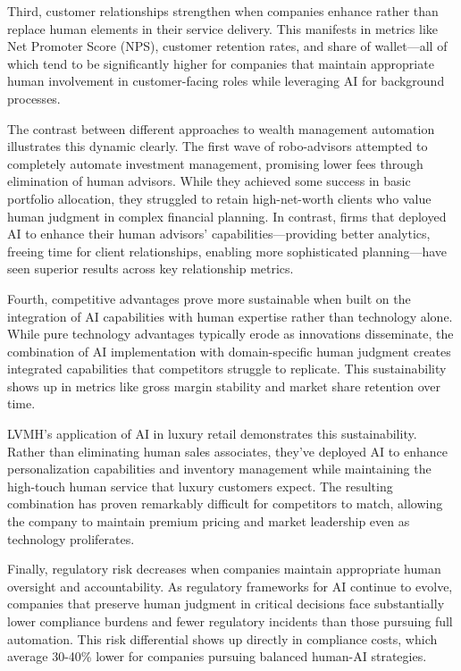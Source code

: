 \documentclass[
  Letterpaper,
]{scrbook}
\begin{document}
Third, customer relationships strengthen when companies enhance rather
than replace human elements in their service delivery. This manifests in
metrics like Net Promoter Score (NPS), customer retention rates, and
share of wallet---all of which tend to be significantly higher for
companies that maintain appropriate human involvement in customer-facing
roles while leveraging AI for background processes.

The contrast between different approaches to wealth management
automation illustrates this dynamic clearly. The first wave of
robo-advisors attempted to completely automate investment management,
promising lower fees through elimination of human advisors. While they
achieved some success in basic portfolio allocation, they struggled to
retain high-net-worth clients who value human judgment in complex
financial planning. In contrast, firms that deployed AI to enhance their
human advisors' capabilities---providing better analytics, freeing time
for client relationships, enabling more sophisticated planning---have
seen superior results across key relationship metrics.

Fourth, competitive advantages prove more sustainable when built on the
integration of AI capabilities with human expertise rather than
technology alone. While pure technology advantages typically erode as
innovations disseminate, the combination of AI implementation with
domain-specific human judgment creates integrated capabilities that
competitors struggle to replicate. This sustainability shows up in
metrics like gross margin stability and market share retention over
time.

LVMH's application of AI in luxury retail demonstrates this
sustainability. Rather than eliminating human sales associates, they've
deployed AI to enhance personalization capabilities and inventory
management while maintaining the high-touch human service that luxury
customers expect. The resulting combination has proven remarkably
difficult for competitors to match, allowing the company to maintain
premium pricing and market leadership even as technology proliferates.

Finally, regulatory risk decreases when companies maintain appropriate
human oversight and accountability. As regulatory frameworks for AI
continue to evolve, companies that preserve human judgment in critical
decisions face substantially lower compliance burdens and fewer
regulatory incidents than those pursuing full automation. This risk
differential shows up directly in compliance costs, which average
30-40\% lower for companies pursuing balanced human-AI strategies.
\end{document}

